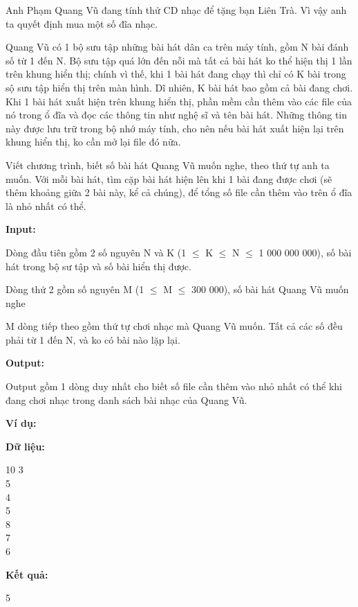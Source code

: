 



   Anh Phạm Quang Vũ đang tính thử CD nhạc để tặng bạn Liên Trà. Vì vậy anh ta quyết định mua một số đĩa nhạc.  

   Quang Vũ có 1 bộ sưu tập những bài hát dân ca trên máy tính, gồm N bài đánh số từ 1 đến N. Bộ sưu tập quá lớn đến nỗi mà tất cả bài hát ko thể hiện thị 1 lần trên khung hiển thị; chính vì thế, khi 1 bài hát đang chạy thì chỉ có K bài trong sộ sưu tập hiển thị trên màn hình. Dĩ nhiên, K bài hát bao gồm cả bài đang chơi. Khi 1 bài hát xuất hiện trên khung hiển thị, phần mềm cần thêm vào các file của nó trong ổ đĩa và đọc các thông tin như nghệ sĩ và tên bài hát. Những thông tin này được lưu trữ trong bộ nhớ máy tính, cho nên nếu bài hát xuất hiện lại trên khung hiển thị, ko cần mở lại file đó nữa.  

   Viết chương trình, biết số bài hát Quang Vũ muốn nghe, theo thứ tự anh ta muốn. Với mỗi bài hát, tìm cặp bài hát hiện lên khi 1 bài đang được chơi (sẽ thêm khoảng giữa 2 bài này, kể cả chúng), để tổng số file cần thêm vào trên ổ đĩa là nhỏ nhất có thể.  



\textbf{    Input:   }

   Dòng đầu tiên gồm 2 số nguyên N và K (1  $\le$  K  $\le$  N  $\le$  1 000 000 000), số bài hát trong bộ sư tập và số bài hiển thị được.  

   Dòng thứ 2 gồm số nguyên M (1  $\le$  M  $\le$  300 000), số bài hát Quang Vũ muốn nghe  

   M dòng tiếp theo gồm thứ tự chơi nhạc mà Quang Vũ muốn. Tất cả các số đều phải từ 1 đến N, và ko có bài nào lặp lại.  



\textbf{    Output:   }

   Output gồm 1 dòng duy nhất cho biết số file cần thêm vào nhỏ nhất có thể khi đang chơi nhạc trong danh sách bài nhạc của Quang Vũ.  

\textbf{    Ví dụ:   }



\textbf{    Dữ liệu:   }

   10 3   
\\   5   
\\   4   
\\   5   
\\   8   
\\   7   
\\   6  



\textbf{    Kết quả:   }

   5  





